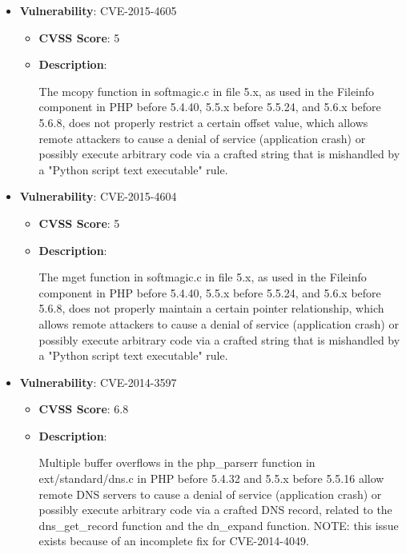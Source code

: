 \documentclass{article}
\begin{document}
\begin{itemize}
        \item \textbf{Vulnerability}: CVE-2015-4605
        \begin{itemize}
            \item \textbf{CVSS Score}:  5 
            \item \textbf{Description}:
            \parbox[t]{0.9\linewidth}{
                \ttfamily The mcopy function in softmagic.c in file 5.x, as used in the Fileinfo component in PHP before 5.4.40, 5.5.x before 5.5.24, and 5.6.x before 5.6.8, does not properly restrict a certain offset value, which allows remote attackers to cause a denial of service (application crash) or possibly execute arbitrary code via a crafted string that is mishandled by a "Python script text executable" rule.
            }
        \end{itemize}
    
        \item \textbf{Vulnerability}: CVE-2015-4604
        \begin{itemize}
            \item \textbf{CVSS Score}:  5 
            \item \textbf{Description}:
            \parbox[t]{0.9\linewidth}{
                \ttfamily The mget function in softmagic.c in file 5.x, as used in the Fileinfo component in PHP before 5.4.40, 5.5.x before 5.5.24, and 5.6.x before 5.6.8, does not properly maintain a certain pointer relationship, which allows remote attackers to cause a denial of service (application crash) or possibly execute arbitrary code via a crafted string that is mishandled by a "Python script text executable" rule.
            }
        \end{itemize}
    
        \item \textbf{Vulnerability}: CVE-2014-3597
        \begin{itemize}
            \item \textbf{CVSS Score}:  6.8 
            \item \textbf{Description}:
            \parbox[t]{0.9\linewidth}{
                \ttfamily Multiple buffer overflows in the php\_parserr function in ext/standard/dns.c in PHP before 5.4.32 and 5.5.x before 5.5.16 allow remote DNS servers to cause a denial of service (application crash) or possibly execute arbitrary code via a crafted DNS record, related to the dns\_get\_record function and the dn\_expand function.  NOTE: this issue exists because of an incomplete fix for CVE-2014-4049.
            }
        \end{itemize}
    

\end{itemize}
\end{document}
